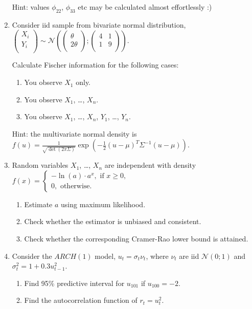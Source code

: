 \documentclass[12pt]{article}
\newcommand \cN{\mathcal{N}}
\begin{document}
\begin{enumerate}
Hint: values $\phi_{22}$, $\phi_{33}$ etc may be calculated almost effortlessly :)

\item Consider iid sample from bivariate normal distribution, 
$
\begin{pmatrix}
	X_i \\
	Y_i \\
\end{pmatrix}	 \sim \cN \left(     
\begin{pmatrix}
	\theta \\
	2\theta \\
\end{pmatrix}; 
\begin{pmatrix}
	4 & 1 \\
	1 & 9 \\
\end{pmatrix}
\right).
$

Calculate Fischer information for the following cases: 
\begin{enumerate}
	\item You observe $X_1$ only. 
	\item You observe $X_1$, \ldots, $X_n$.
	\item You observe $X_1$, \ldots, $X_n$, $Y_1$, \ldots, $Y_n$.
\end{enumerate}

Hint: the multivariate normal density is 
$
f(u) = \frac{1}{\sqrt{\det(2\pi \Sigma)}} \exp( -\frac{1}{2}(u-\mu)^T \Sigma^{-1}(u-\mu)).
$

\item Random variables $X_1$, \ldots, $X_n$ are independent with density 
$
f(x) = \begin{cases}
	-\ln(a) \cdot a^x, \text{ if } x\geq 0, \\
	0, \text{ otherwise.}
\end{cases}	
$
\begin{enumerate}
	\item Estimate $a$ using maximum likelihood. 
	\item Check whether the estimator is unbiased and consistent. 
	\item Check whether the corresponding Cramer-Rao lower bound is attained. 
\end{enumerate}

\item Consider the $ARCH(1)$ model, $u_t = \sigma_t \nu_t$, where $\nu_t$ are iid $\cN(0;1)$ and 
$\sigma^2_t = 1 + 0.3 u_{t-1}^2$. 
\begin{enumerate}
	\item Find 95\% predictive interval for $u_{101}$ if $u_{100} = -2$.
	\item Find the autocorrelation function of $r_t = u_t^2$. 
\end{enumerate}


\end{enumerate}
\end{document}
